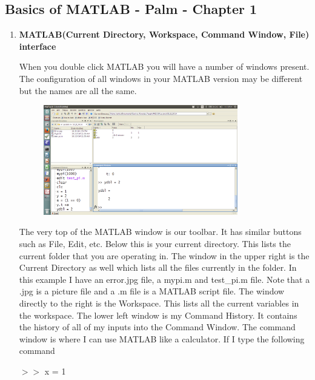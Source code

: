 \subsection{Basics of MATLAB - Palm - Chapter 1}

\begin{enumerate}

\item \textbf{MATLAB(Current Directory, Workspace, Command Window, File)
interface}

When you double click MATLAB you will have a number of windows
present. The configuration of all windows in your MATLAB version may
be different but the names are all the same.

\begin{figure}[htb]
  \begin{center}
    \includegraphics[height=0.55\textwidth,width=0.8\textwidth]{Graphics/MATLAB}
  \end{center}
\end{figure}

The very top of the MATLAB window is our toolbar. It has similar
buttons such as File, Edit, etc. Below this is your current
directory. This lists the current folder that you are operating
in. The window in the upper right is the Current Directory as well
which lists all the files currently in the folder. In this example I
have an error.jpg file, a mypi.m and test\_pi.m file. Note that a .jpg
is a picture file and a .m file is a MATLAB script file. The window
directly to the right is the Workspace. This lists all the current
variables in the workspace. The lower left window is my Command
History. It contains the history of all of my inputs into the Command
Window. The command window is where I can use MATLAB like a
calculator. If I type the following command

$>>$ x = 1


\end{enumerate}
